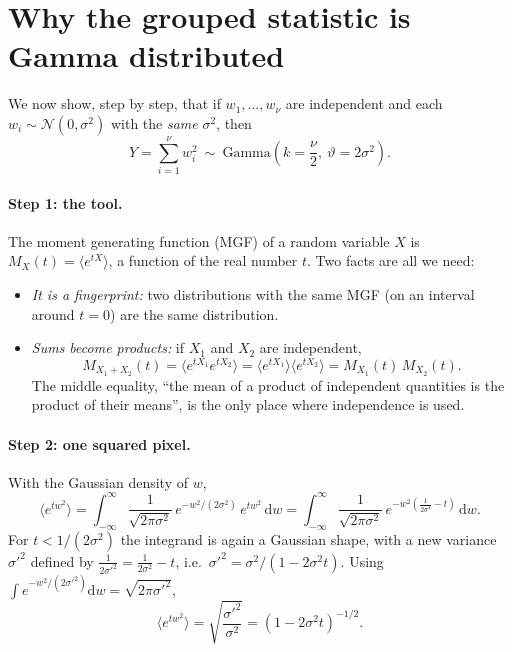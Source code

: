 \documentclass[11pt,a4paper]{article}
\newcommand{\dd}{\mathrm{d}}
\begin{document}
\section{Why the grouped statistic is Gamma distributed}\label{sec:wgamma}

We now show, step by step, that if $w_1,\dots,w_\nu$ are independent and each
$w_i\sim\mathcal N(0,\sigma^2)$ with the \emph{same} $\sigma^2$, then
\begin{equation}
  Y = \sum_{i=1}^{\nu} w_i^2 \ \sim\ \mathrm{Gamma}\!\left(k=\frac{\nu}{2},\ \vartheta = 2\sigma^2\right).
  \label{eq:Ygamma}
\end{equation}

\paragraph{Step 1: the tool.} The moment generating function (MGF) of a random
variable $X$ is $M_X(t)=\langle e^{tX}\rangle$, a function of the real number $t$. Two
facts are all we need:
\begin{itemize}
  \item[(A)] \emph{It is a fingerprint:} two distributions with the same MGF (on an
        interval around $t=0$) are the same distribution.
  \item[(B)] \emph{Sums become products:} if $X_1$ and $X_2$ are independent,
        \[
          M_{X_1+X_2}(t)=\langle e^{tX_1}e^{tX_2}\rangle=\langle e^{tX_1}\rangle\langle e^{tX_2}\rangle
          = M_{X_1}(t)\,M_{X_2}(t).
        \]
        The middle equality, ``the mean of a product of independent quantities is the
        product of their means'', is the only place where independence is used.
\end{itemize}

\paragraph{Step 2: one squared pixel.} With the Gaussian density of $w$,
\[
  \langle e^{tw^2}\rangle = \int_{-\infty}^{\infty}\frac{1}{\sqrt{2\pi\sigma^2}}\,
  e^{-w^2/(2\sigma^2)}\,e^{tw^2}\,\dd w
  = \int_{-\infty}^{\infty}\frac{1}{\sqrt{2\pi\sigma^2}}\,
  e^{-w^2\left(\frac{1}{2\sigma^2}-t\right)}\,\dd w .
\]
For $t<1/(2\sigma^2)$ the integrand is again a Gaussian shape, with a new variance
$\sigma'^2$ defined by $\frac{1}{2\sigma'^2}=\frac{1}{2\sigma^2}-t$, i.e.\
$\sigma'^2=\sigma^2/(1-2\sigma^2t)$. Using $\int e^{-w^2/(2\sigma'^2)}\dd w=\sqrt{2\pi\sigma'^2}$,
\[
  \langle e^{tw^2}\rangle = \sqrt{\frac{\sigma'^2}{\sigma^2}} = (1-2\sigma^2t)^{-1/2}.
\]
\end{document}
